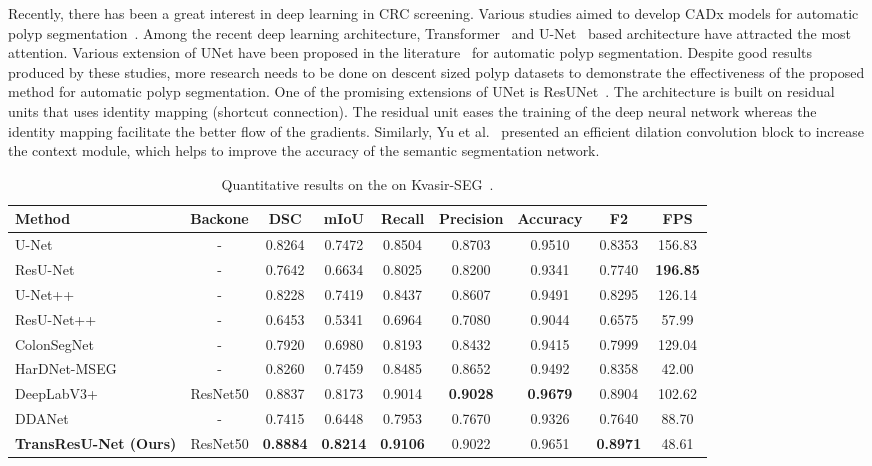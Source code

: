 \documentclass[conference]{IEEEtran}
\begin{document}
Recently, there has been a great interest in deep learning in \ac{CRC} screening. Various studies aimed to develop CADx models for automatic polyp segmentation~\cite{tomar2022tganet,huang2021hardnet,jha2020doubleu,fan2020pranet,tomar2022fanet,jha2021real,zhou2018unet++}. Among the recent deep learning architecture, Transformer~\cite{vaswani2017attention} and U-Net~\cite{ronneberger2015u} based architecture have attracted the most attention. Various extension of UNet have been proposed in the literature~\cite{zhou2018unet++,jha2019resunet++,jha2020doubleu} for automatic polyp segmentation. Despite good results produced by these studies, more research needs to be done on descent sized polyp datasets to demonstrate the effectiveness of the proposed method for automatic polyp segmentation. One of the promising extensions of UNet is ResUNet~\cite{zhang2018road}. The architecture is built on residual units that uses identity mapping (shortcut connection). The residual unit eases the training of the deep neural network whereas the identity mapping facilitate the better flow of the gradients. Similarly, Yu et al.~\cite{yu2015multi} presented an efficient dilation convolution block to increase the context module, which helps to improve the accuracy of the semantic segmentation network. 

\begin{table*}[t!]
\centering
\caption{Quantitative results on the on Kvasir-SEG~\cite{jha2020kvasir}.}
 \begin{tabular} {@{}l|c|c|c|c|c|c|c|c@{}}
\toprule
\textbf{Method} & \textbf{Backone} &\textbf{DSC} & \textbf{mIoU} &\textbf{Recall}  &\textbf{Precision}& \textbf{Accuracy} &\textbf{F2} &\textbf{FPS}\\ 
\hline
U-Net~\cite{ronneberger2015u} &-	&0.8264	&0.7472	&0.8504	&0.8703	&0.9510	&0.8353	&156.83\\
ResU-Net~\cite{zhang2018road}&-&	0.7642	&0.6634	&0.8025	&0.8200	&0.9341	&0.7740	&\textbf{196.85}\\
U-Net++~\cite{zhou2018unet++}&-&0.8228	&0.7419	&0.8437	&0.8607	&0.9491	&0.8295	&126.14\\
ResU-Net++~\cite{jha2019resunet++}&- &0.6453	&0.5341	&0.6964	&0.7080	&0.9044	&0.6575	&57.99\\
ColonSegNet~\cite{jha2021real}	&-&0.7920	&0.6980	&0.8193	&0.8432	&0.9415	&0.7999	&129.04\\
HarDNet-MSEG~\cite{huang2021hardnet}&-&0.8260 &0.7459	&0.8485	&0.8652	&0.9492	&0.8358	&42.00\\
DeepLabV3+\cite{chen2018encoder}  &ResNet50 &0.8837	&0.8173	&0.9014	&\textbf{0.9028}	&\textbf{0.9679}	&0.8904	&102.62\\
DDANet~\cite{tomar2021ddanet}	&- &0.7415	&0.6448	&0.7953	&0.7670	&0.9326	&0.7640	&88.70\\
\textbf{TransResU-Net (Ours)}	& ResNet50 &\textbf{0.8884} &\textbf{0.8214} &\textbf{0.9106} &0.9022 &0.9651 &\textbf{0.8971} &48.61\\
\hline
\end{tabular}
\vspace{-2mm}
\label{tab:results-kvasir}
\end{table*}
\end{document}
